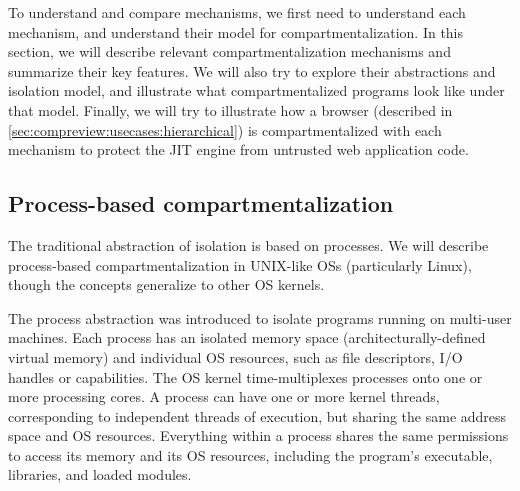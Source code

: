 To understand and compare mechanisms, we first need to understand each 
mechanism, and understand their model for compartmentalization.
In this section, we will describe relevant compartmentalization mechanisms
and summarize their key features.
We will also try to explore their abstractions and isolation model,
and illustrate what compartmentalized programs look like under that model.
Finally, we will try to illustrate how a browser 
(described in \autoref{sec:compreview:usecases:hierarchical}) is 
compartmentalized with each mechanism to protect the JIT engine from
untrusted web application code.

\subsection{Process-based compartmentalization}

The traditional abstraction of isolation is based on processes.
We will describe process-based compartmentalization in UNIX-like OSs
(particularly Linux), 
though the concepts generalize to other OS kernels.

The process abstraction was introduced to isolate programs running on 
multi-user machines.
Each process has an isolated memory space (architecturally-defined virtual memory)
and individual OS resources, such as file descriptors, I/O handles or capabilities.
The OS kernel time-multiplexes processes onto one or more processing cores.
A process can have one or more kernel threads, corresponding to independent threads
of execution, but sharing the same address space and OS resources.
Everything within a process shares the same permissions to access its memory and
its OS resources, including the program's executable, libraries, and loaded modules.

